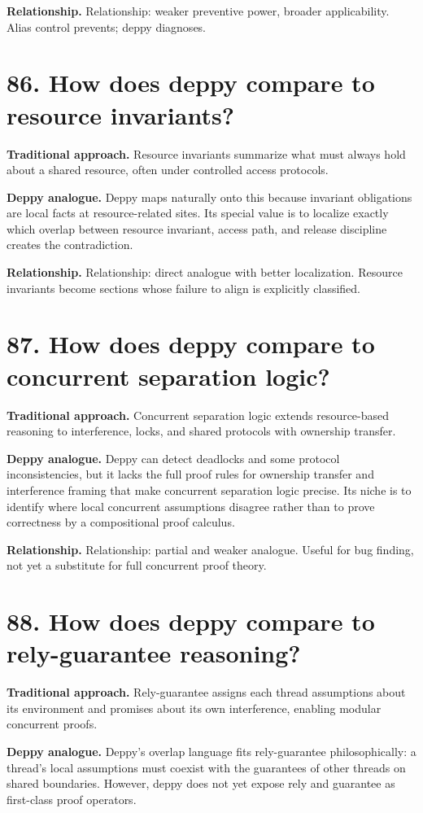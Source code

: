 \documentclass[11pt,openany]{book}
\begin{document}
\textbf{Relationship.} Relationship: weaker preventive power, broader applicability. Alias control prevents; deppy diagnoses.

\section*{86. How does deppy compare to resource invariants?}
\textbf{Traditional approach.} Resource invariants summarize what must always hold about a shared resource, often under controlled access protocols.

\textbf{Deppy analogue.} Deppy maps naturally onto this because invariant obligations are local facts at resource-related sites. Its special value is to localize exactly which overlap between resource invariant, access path, and release discipline creates the contradiction.

\textbf{Relationship.} Relationship: direct analogue with better localization. Resource invariants become sections whose failure to align is explicitly classified.

\section*{87. How does deppy compare to concurrent separation logic?}
\textbf{Traditional approach.} Concurrent separation logic extends resource-based reasoning to interference, locks, and shared protocols with ownership transfer.

\textbf{Deppy analogue.} Deppy can detect deadlocks and some protocol inconsistencies, but it lacks the full proof rules for ownership transfer and interference framing that make concurrent separation logic precise. Its niche is to identify where local concurrent assumptions disagree rather than to prove correctness by a compositional proof calculus.

\textbf{Relationship.} Relationship: partial and weaker analogue. Useful for bug finding, not yet a substitute for full concurrent proof theory.

\section*{88. How does deppy compare to rely-guarantee reasoning?}
\textbf{Traditional approach.} Rely-guarantee assigns each thread assumptions about its environment and promises about its own interference, enabling modular concurrent proofs.

\textbf{Deppy analogue.} Deppy's overlap language fits rely-guarantee philosophically: a thread's local assumptions must coexist with the guarantees of other threads on shared boundaries. However, deppy does not yet expose rely and guarantee as first-class proof operators.
\end{document}
